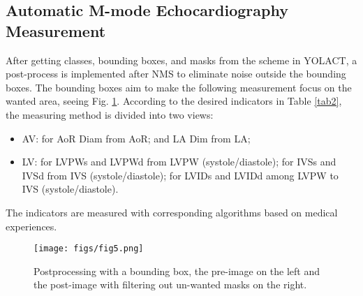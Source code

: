 \documentclass{article}
\begin{document}
\subsection{Automatic M-mode Echocardiography Measurement}
\label{sec4.3}
After getting classes, bounding boxes, and masks from the scheme in YOLACT, a post-process is implemented after NMS to eliminate noise outside the bounding boxes. The bounding boxes aim to make the following measurement focus on the wanted area, seeing Fig. \ref{fig5}. According to the desired indicators in Table \ref{tab2}, the measuring method is divided into two views:
\begin{itemize}
    \item AV: for AoR Diam from AoR; and LA Dim from LA;
    \item LV: for LVPWs and LVPWd from LVPW (systole/diastole); for IVSs and IVSd from IVS (systole/diastole); for LVIDs and LVIDd among LVPW to IVS (systole/diastole).
\end{itemize}
The indicators are measured with corresponding algorithms based on medical experiences.

\begin{figure}[!t]
    \centering
    \texttt{[image: figs/fig5.png]}
    \caption{Postprocessing with a bounding box, the pre-image on the left and the post-image with filtering out un-wanted masks on the right.}
    \label{fig5}
\end{figure}
\end{document}
